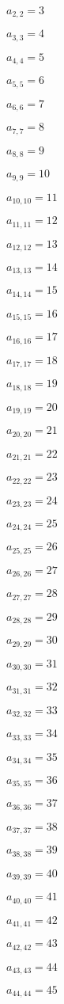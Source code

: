 \documentclass[a4paper,12pt]{article}
\begin{document}
$a _{ 2, 2 } = 3$

$a _{ 3, 3 } = 4$

$a _{ 4, 4 } = 5$

$a _{ 5, 5 } = 6$

$a _{ 6, 6 } = 7$

$a _{ 7, 7 } = 8$

$a _{ 8, 8 } = 9$

$a _{ 9, 9 } = 10$

$a _{ 10, 10 } = 11$

$a _{ 11, 11 } = 12$

$a _{ 12, 12 } = 13$

$a _{ 13, 13 } = 14$

$a _{ 14, 14 } = 15$

$a _{ 15, 15 } = 16$

$a _{ 16, 16 } = 17$

$a _{ 17, 17 } = 18$

$a _{ 18, 18 } = 19$

$a _{ 19, 19 } = 20$

$a _{ 20, 20 } = 21$

$a _{ 21, 21 } = 22$

$a _{ 22, 22 } = 23$

$a _{ 23, 23 } = 24$

$a _{ 24, 24 } = 25$

$a _{ 25, 25 } = 26$

$a _{ 26, 26 } = 27$

$a _{ 27, 27 } = 28$

$a _{ 28, 28 } = 29$

$a _{ 29, 29 } = 30$

$a _{ 30, 30 } = 31$

$a _{ 31, 31 } = 32$

$a _{ 32, 32 } = 33$

$a _{ 33, 33 } = 34$

$a _{ 34, 34 } = 35$

$a _{ 35, 35 } = 36$

$a _{ 36, 36 } = 37$

$a _{ 37, 37 } = 38$

$a _{ 38, 38 } = 39$

$a _{ 39, 39 } = 40$

$a _{ 40, 40 } = 41$

$a _{ 41, 41 } = 42$

$a _{ 42, 42 } = 43$

$a _{ 43, 43 } = 44$

$a _{ 44, 44 } = 45$
\end{document}
